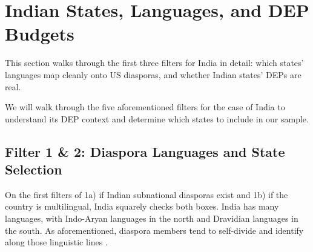\documentclass[12pt]{article}
\let\oldsection\section
\renewcommand{\section}{\FloatBarrier\oldsection}
\let\oldsubsection\subsection
\renewcommand{\subsection}{\FloatBarrier\oldsubsection}
\begin{document}
\section{Indian States, Languages, and DEP Budgets} \label{sec:oa_states}

This section walks through the first three filters for India in detail: which states' languages map cleanly onto US diasporas, and whether Indian states' DEPs are real.

We will walk through the five aforementioned filters for the case of India to understand its DEP context and determine which states to include in our sample.

\subsection{Filter 1 \& 2: Diaspora Languages and State Selection} \label{ss:diaspora languages, state selection}
On the first filters of 1a) if Indian subnational diasporas exist and 1b) if the country is multilingual, India squarely checks both boxes. India has many languages, with Indo-Aryan languages in the north and Dravidian languages in the south. As aforementioned, diaspora members tend to self-divide and identify along those linguistic lines \citep{sahoo_issues_2006, gautam_indian_2013}. 
\end{document}
